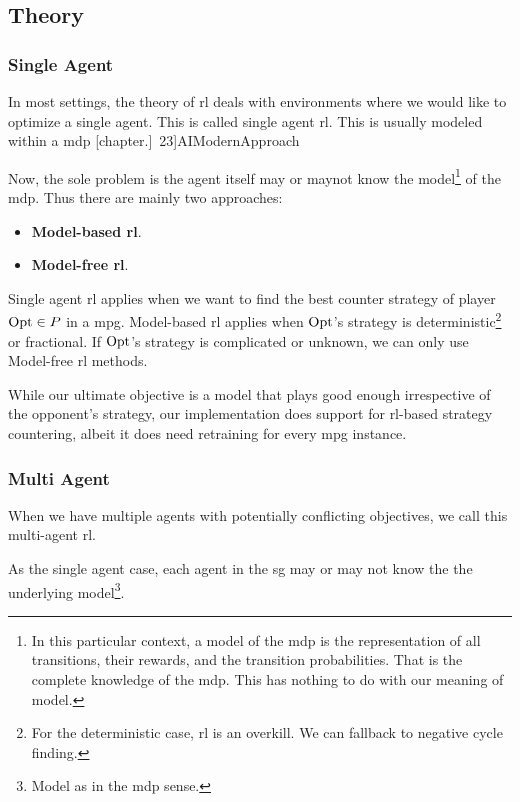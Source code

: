 \subsection{Theory}
\subsubsection{Single Agent}
In most settings, the theory of \acrshort{rl} deals with environments where we would like to optimize a single agent. This is called single agent \acrshort{rl}. This is usually modeled within a \acrfull{mdp}
\parencites[chapter.~3]{RLIntroduction}[chapter.]~23]{AIModernApproach}

Now, the sole problem is the agent itself may or maynot know the model\footnote{In this particular context, a model of the \acrshort{mdp} is the representation of all transitions, their rewards, and the transition probabilities. That is the complete knowledge of the \acrshort{mdp}. This has nothing to do with our meaning of model.} of the \acrshort{mdp}. Thus there are mainly two approaches:
\begin{itemize}
	\item \textbf{Model-based \acrshort{rl}}.
	\item \textbf{Model-free \acrshort{rl}}. 
\end{itemize}

Single agent \acrshort{rl} applies when we want to find the best counter strategy of player $\operatorname{Opt}\in P$ in a \acrshort{mpg}. Model-based \acrshort{rl} applies when $\operatorname{Opt}$'s strategy is deterministic\footnote{For the deterministic case, \acrshort{rl} is an overkill. We can fallback to negative cycle finding.} or fractional. If $\operatorname{Opt}$'s strategy is complicated or unknown, we can only use Model-free \acrshort{rl} methods.

While our ultimate objective is a model that plays good enough irrespective of the opponent's strategy, our implementation does support for \acrshort{rl}-based strategy countering, albeit it does need retraining for every \acrshort{mpg} instance.

\subsubsection{Multi Agent}
When we have multiple agents with potentially conflicting objectives, we call this multi-agent \acrshort{rl}.

As the single agent case, each agent in the \acrshort{sg} may or may not know the the underlying model\footnote{Model as in the \acrshort{mdp} sense.}.

